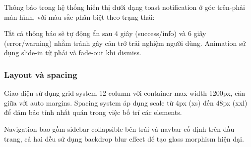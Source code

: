 Thông báo trong hệ thống hiển thị dưới dạng toast notification ở góc trên-phải màn hình, với màu sắc phân biệt theo trạng thái:

Tất cả thông báo sẽ tự động ẩn sau 4 giây (success/info) và 6 giây (error/warning) nhằm tránh gây cản trở trải nghiệm người dùng. Animation sử dụng slide-in từ phải và fade-out khi dismiss.

\subsubsection{Layout và spacing}

Giao diện sử dụng grid system 12-column với container max-width 1200px, căn giữa với auto margins. Spacing system áp dụng scale từ 4px (xs) đến 48px (xxl) để đảm bảo tính nhất quán trong việc bố trí các elements.

Navigation bao gồm sidebar collapsible bên trái và navbar cố định trên đầu trang, cả hai đều sử dụng backdrop blur effect để tạo glass morphism hiện đại. 